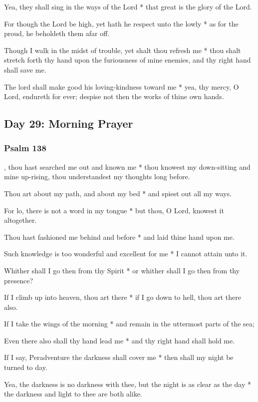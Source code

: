 Yea, they shall sing in the ways of the Lord * that great is the glory of the Lord.

For though the Lord be high, yet hath he respect unto the lowly * as for the proud, he beholdeth them afar off.

Though I walk in the midst of trouble, yet shalt thou refresh me * thou shalt stretch forth thy hand upon the furiousness of mine enemies, and thy right hand shall save me.

The lord shall make good his loving-kindness toward me * yea, thy mercy, O Lord, endureth for ever; despise not then the works of thine own hands.

\subsection{Day 29: Morning Prayer}

\subsubsection{Psalm 138}


, thou hast searched me out and known me * thou knowest my down-sitting and mine up-rising, thou understandest my thoughts long before.

Thou art about my path, and about my bed * and spiest out all my ways.

For lo, there is not a word in my tongue * but thou, O Lord, knowest it altogether.

Thou hast fashioned me behind and before * and laid thine hand upon me.

Such knowledge is too wonderful and excellent for me * I cannot attain unto it.

Whither shall I go then from thy Spirit * or whither shall I go then from thy presence?

If I climb up into heaven, thou art there * if I go down to hell, thou art there also.

If I take the wings of the morning * and remain in the uttermost parts of the sea;

Even there also shall thy hand lead me * and thy right hand shall hold me.

If I say, Peradventure the darkness shall cover me * then shall my night be turned to day.

Yea, the darkness is no darkness with thee, but the night is as clear as the day * the darkness and light to thee are both alike.

